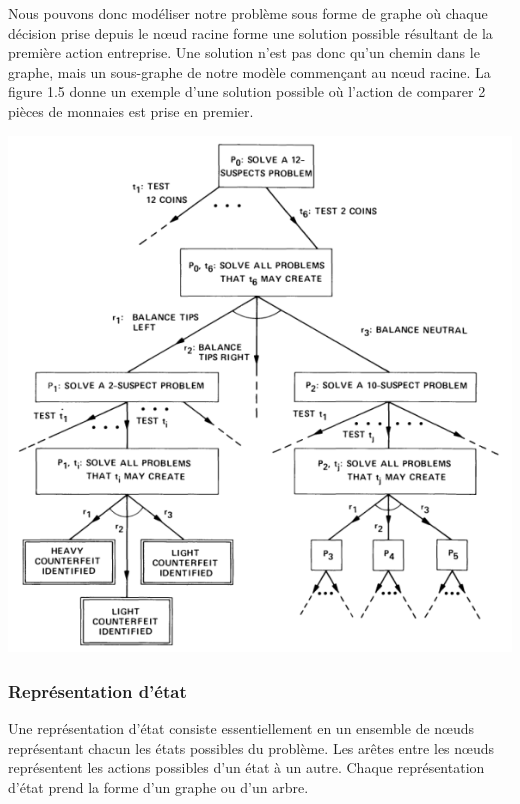 Nous pouvons donc modéliser notre problème sous forme de graphe où chaque décision prise depuis le nœud racine forme une solution possible résultant de la première action entreprise. Une solution n'est pas donc qu'un chemin dans le graphe, mais un sous-graphe de notre modèle commençant au nœud racine. La figure 1.5 donne un exemple d'une solution possible où l'action de comparer 2 pièces de monnaies est prise en premier.

\begin{center}
    \includegraphics[scale=0.8]{../ressources/images/counterfeit_problem_and_or_graph.png}
\end{center}


\subsubsection{Représentation d'état}
Une représentation d'état consiste essentiellement en un ensemble de nœuds représentant chacun les états possibles du problème. Les arêtes entre les nœuds représentent les actions possibles d'un état à un autre. 
Chaque représentation d'état prend la forme d'un graphe ou d'un arbre.

